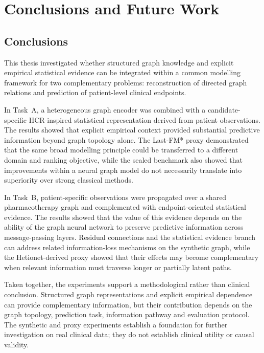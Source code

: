 \chapter{Conclusions and Future Work}
\label{ch:conclusions}

\section{Conclusions}
\label{sec:conclusions}

This thesis investigated whether structured graph knowledge and explicit empirical
statistical evidence can be integrated within a common modelling framework for two
complementary problems: reconstruction of directed graph relations and prediction of
patient-level clinical endpoints.

In Task~A, a heterogeneous graph encoder was combined with a candidate-specific
HCR-inspired statistical representation derived from patient observations. The results
showed that explicit empirical context provided substantial predictive information beyond
graph topology alone. The Last-FM* proxy demonstrated that the same broad modelling
principle could be transferred to a different domain and ranking objective, while the sealed
benchmark also showed that improvements within a neural graph model do not necessarily
translate into superiority over strong classical methods.

In Task~B, patient-specific observations were propagated over a shared pharmacotherapy
graph and complemented with endpoint-oriented statistical evidence. The results showed
that the value of this evidence depends on the ability of the graph neural network to
preserve predictive information across message-passing layers. Residual connections and
the statistical evidence branch can address related information-loss mechanisms on the
synthetic graph, while the Hetionet-derived proxy showed that their effects may become
complementary when relevant information must traverse longer or partially latent paths.

Taken together, the experiments support a methodological rather than clinical conclusion.
Structured graph representations and explicit empirical dependence can provide
complementary information, but their contribution depends on the graph topology,
prediction task, information pathway and evaluation protocol. The synthetic and proxy
experiments establish a foundation for further investigation on real clinical data; they do
not establish clinical utility or causal validity.

